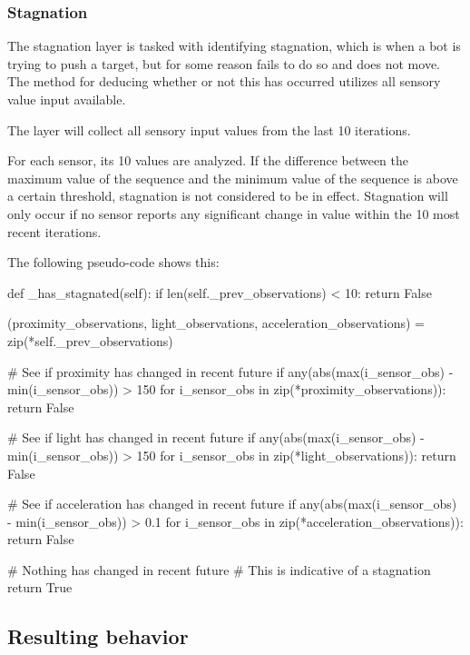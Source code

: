 \documentclass[a4paper,10pt]{article}
\newcommand{\tickspersecond}{10}
\begin{document}
\subsubsection{Stagnation}
The stagnation layer is tasked with identifying stagnation, which is when a 
bot is trying to push a target, but for some reason fails to do so and does 
not move. The method for deducing whether or not this has occurred utilizes 
all sensory value input available.

The layer will collect all sensory input values from the last 
{\tickspersecond} iterations.  

For each sensor, its {\tickspersecond} values are analyzed. If the difference 
between the maximum value of the sequence and the minimum value of the 
sequence is above a certain threshold, stagnation is not considered to be in 
effect. Stagnation will only occur if no sensor reports any significant change 
in value within the {\tickspersecond} most recent iterations.

The following pseudo-code shows this:

\begin{python}
def _has_stagnated(self):
    if len(self._prev_observations) < 10:
        return False

    (proximity_observations,
     light_observations,
     acceleration_observations) = zip(*self._prev_observations)

    # See if proximity has changed in recent future
    if any(abs(max(i_sensor_obs) - min(i_sensor_obs)) > 150
           for i_sensor_obs in zip(*proximity_observations)):
        return False

    # See if light has changed in recent future
    if any(abs(max(i_sensor_obs) - min(i_sensor_obs)) > 150
           for i_sensor_obs in zip(*light_observations)):
        return False

    # See if acceleration has changed in recent future
    if any(abs(max(i_sensor_obs) - min(i_sensor_obs)) > 0.1
           for i_sensor_obs in zip(*acceleration_observations)):
        return False

    # Nothing has changed in recent future
    # This is indicative of a stagnation
    return True
\end{python}

\subsection{Resulting behavior}
\label{sec:part-a behavior}
\end{document}
